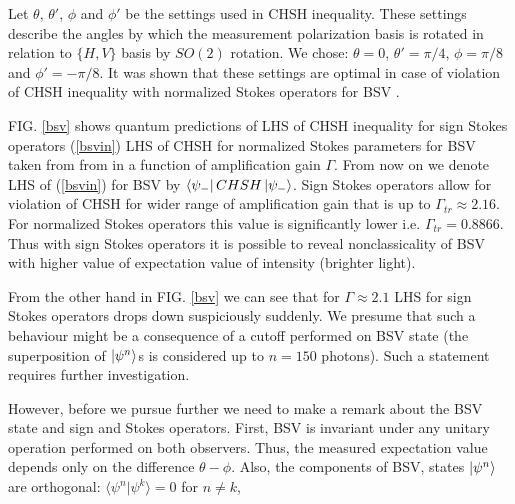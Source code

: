 \documentclass[aps,pra, twocolumn, showpacs]{revtex4-2}
\begin{document}
Let  $\theta$, $\theta'$, $\phi$ and $\phi'$ be the settings used in CHSH inequality. These settings describe the angles by which the measurement polarization basis is rotated in relation to $\{H,V\}$ basis by $\mathit{SO}(2)$ rotation. 
We chose: $\theta=0$, $\theta'=\pi/4$, $\phi=\pi/8$ and  $\phi'=-\pi/8$.  
It was shown that these settings are  optimal in case of violation of CHSH inequality with normalized Stokes operators for BSV \cite{ZUKUBELL}.


FIG. \ref{bsv} shows quantum predictions of LHS of CHSH inequality for sign Stokes operators (\ref{bsvin})  LHS of CHSH for normalized Stokes parameters for BSV taken from from \cite{ZUKUBELL}  in a function of amplification gain $\Gamma$. From now on  we denote  LHS of (\ref{bsvin}) for BSV by $\bra{\psi_-}CHSH\ket{\psi_-}$. 
Sign Stokes operators allow for violation of CHSH for wider range of amplification gain that is  up to $\Gamma_{tr}\approx 2.16$.
For normalized Stokes operators this value is  significantly lower i.e. $\Gamma_{tr}=0.8866$. 
Thus with sign Stokes  operators it is possible to reveal nonclassicality of  BSV with higher value of expectation value of intensity (brighter light).


From the other hand in FIG. \ref{bsv}  we can see that for $\Gamma\approx 2.1$  LHS for sign Stokes operators drops down suspiciously suddenly.
We presume that such a behaviour might be a consequence of a cutoff  performed on BSV state (the superposition of  $\ket{\psi^n}$s is considered up to $n=150$ photons). Such a statement requires further investigation.

However, before we pursue further we need to make a remark
about the BSV state  and sign and Stokes operators. First, BSV is invariant under any unitary operation performed on both observers.
Thus, the measured expectation value depends only on the difference $\theta-\phi$. Also, the components of BSV, states $\ket{\psi^n}$ are  orthogonal: $\langle{\psi^n|\psi^k}\rangle = 0$ for $n \neq k$, 
\end{document}
